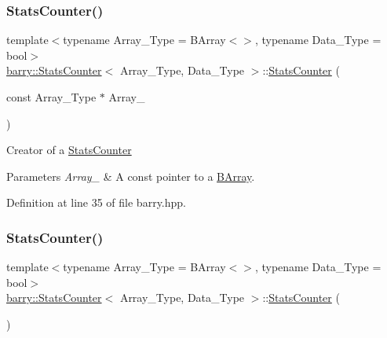 \subsubsection{\texorpdfstring{Stats\+Counter()}{StatsCounter()}\hspace{0.1cm}{\footnotesize\ttfamily [1/2]}}
{\footnotesize\ttfamily template$<$typename Array\+\_\+\+Type = B\+Array$<$$>$, typename Data\+\_\+\+Type = bool$>$ \\
\hyperlink{classbarry_1_1_stats_counter}{barry\+::\+Stats\+Counter}$<$ Array\+\_\+\+Type, Data\+\_\+\+Type $>$\+::\hyperlink{classbarry_1_1_stats_counter}{Stats\+Counter} (\begin{DoxyParamCaption}\item[{const Array\+\_\+\+Type $\ast$}]{Array\+\_\+ }\end{DoxyParamCaption})\hspace{0.3cm}{\ttfamily [inline]}}



Creator of a {\ttfamily \hyperlink{classbarry_1_1_stats_counter}{Stats\+Counter}} 


\begin{DoxyParams}{Parameters}
{\em Array\+\_\+} & A const pointer to a {\ttfamily \hyperlink{classbarry_1_1_b_array}{B\+Array}}. \\
\hline
\end{DoxyParams}


Definition at line 35 of file barry.\+hpp.

\mbox{\label{classbarry_1_1_stats_counter_a407df1580b207faac92c476c7062b840}} 
\subsubsection{\texorpdfstring{Stats\+Counter()}{StatsCounter()}\hspace{0.1cm}{\footnotesize\ttfamily [2/2]}}
{\footnotesize\ttfamily template$<$typename Array\+\_\+\+Type = B\+Array$<$$>$, typename Data\+\_\+\+Type = bool$>$ \\
\hyperlink{classbarry_1_1_stats_counter}{barry\+::\+Stats\+Counter}$<$ Array\+\_\+\+Type, Data\+\_\+\+Type $>$\+::\hyperlink{classbarry_1_1_stats_counter}{Stats\+Counter} (\begin{DoxyParamCaption}{ }\end{DoxyParamCaption})\hspace{0.3cm}{\ttfamily [inline]}}



